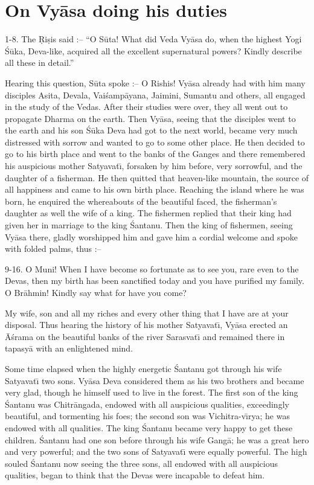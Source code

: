 \chapter{On Vy\=asa doing his duties}

1-8. The \d{R}i\d{s}is said :-- ``O S\=uta! What did Veda Vy\=asa do, when the highest Yogi \'S\=uka, Deva-like, acquired all the excellent supernatural powers? Kindly describe all these in detail.''

Hearing this question, S\=uta spoke :-- O Rishis! Vy\=asa already had with him many disciples Asita, Devala, Vai\'samp\=ayana, Jaimini, Sumantu and others, all engaged in the study of the Vedas. After their studies were over, they all went out to propagate Dharma on the earth. Then Vy\=asa, seeing that the disciples went to the earth and his son \'S\=uka Deva had got to the next world, became very much distressed with sorrow and wanted to go to some other place. He then decided to go to his birth place and went to the banks of the Ganges and there remembered his auspicious mother Satyavat\={\i}, forsaken by him before, very sorrowful, and the daughter of a fisherman. He then quitted that heaven-like mountain, the source of all happiness and came to his own birth place. Reaching the island where he was born, he enquired the whereabouts of the beautiful faced, the fisherman's daughter as well the wife of a king. The fishermen replied that their king had given her in marriage to the king \'Santanu. Then the king of fishermen, seeing Vy\=asa there, gladly worshipped him and gave him a cordial welcome and spoke with folded palms, thus :--

9-16. O Muni! When I have become so fortunate as to see you, rare even to the Devas, then my birth has been sanctified today and you have purified my family. O Br\=ahmin! Kindly say what for have you come?

My wife, son and all my riches and every other thing that I have are at your disposal. Thus hearing the history of his mother Satyavat\={\i}, Vy\=asa erected an \=A\'srama on the beautiful banks of the river Sarasvat\={\i} and remained there in tapasy\=a with an enlightened mind.

Some time elapsed when the highly energetic \'Santanu got through his wife Satyavat\={\i} two sons. Vy\=asa Deva considered them as his two brothers and became very glad, though he himself used to live in the forest. The first son of the king \'Santanu was Chitr\=angada, endowed with all auspicious qualities, exceedingly beautiful, and tormenting his foes; the second son was Vichitra-v\={\i}rya; he was endowed with all qualities. The king \'Santanu became very happy to get these children. \'Santanu had one son before through his wife Gang\=a; he was a great hero and very powerful; and the two sons of Satyavat\={\i} were equally powerful. The high souled \'Santanu now seeing the three sons, all endowed with all auspicious qualities, began to think that the Devas were incapable to defeat him.

